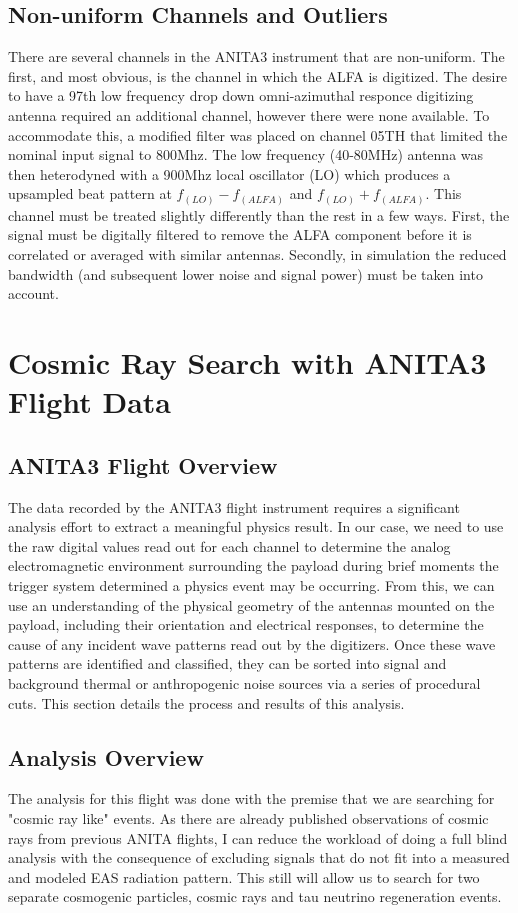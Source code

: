 \section{Non-uniform Channels and Outliers}
	There are several channels in the ANITA3 instrument that are non-uniform.  The first, and most obvious, is the channel in which the ALFA is digitized.  The desire to have a 97th low frequency drop down omni-azimuthal responce digitizing antenna required an additional channel, however there were none available.  To accommodate this, a modified filter was placed on channel 05TH that limited the nominal input signal to 800Mhz.  The low frequency (40-80MHz) antenna was then heterodyned with a 900Mhz local oscillator (LO) which produces a upsampled beat pattern at $f_(LO)-f_(ALFA)$ and $f_(LO)+f_(ALFA)$. This channel must be treated slightly differently than the rest in a few ways.  First, the signal must be digitally filtered to remove the ALFA component before it is correlated or averaged with similar antennas.  Secondly, in simulation the reduced bandwidth (and subsequent lower noise and signal power) must be taken into account.

\chapter{Cosmic Ray Search with ANITA3 Flight Data}
\section{ANITA3 Flight Overview}
	The data recorded by the ANITA3 flight instrument requires a significant analysis effort to extract a meaningful physics result.  In our case, we need to use the raw digital values read out for each channel to determine the analog electromagnetic environment surrounding the payload during brief moments the trigger system determined a physics event may be occurring.  From this, we can use an understanding of the physical geometry of the antennas mounted on the payload, including their orientation and electrical responses, to determine the cause of any incident wave patterns read out by the digitizers.  Once these wave patterns are identified and classified, they can be sorted into signal and background thermal or anthropogenic noise sources via a series of procedural cuts.  This section details the process and results of this analysis.
	
\section{Analysis Overview}
	The analysis for this flight was done with the premise that we are searching for "cosmic ray like" events.  As there are already published observations of cosmic rays from previous ANITA flights, I can reduce the workload of doing a full blind analysis with the consequence of excluding signals that do not fit into a measured and modeled EAS radiation pattern.  This still will allow us to search for two separate cosmogenic particles, cosmic rays and tau neutrino regeneration events.

